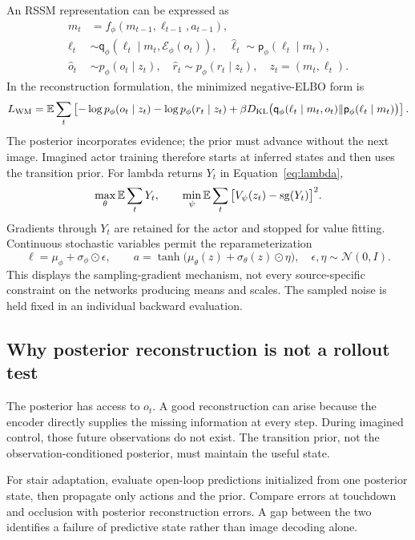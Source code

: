 An RSSM representation can be expressed as
\begin{align}
m_t&=f_\phi(m_{t-1},\ell_{t-1},a_{t-1}),\\
\ell_t&\sim\mathsf q_\phi(\ell_t\mid m_t,\mathcal E_\phi(o_t)),
\quad\hat\ell_t\sim\mathsf p_\phi(\ell_t\mid m_t),\\
\hat o_t&\sim p_\phi(o_t\mid z_t),\quad
\hat r_t\sim p_\phi(r_t\mid z_t),\quad z_t=(m_t,\ell_t).
\end{align}
In the reconstruction formulation, the minimized negative-ELBO form is
\begin{equation}
L_{\rm WM}=\mathbb E\sum_t\left[-\log p_\phi(o_t\mid z_t)-\log p_\phi(r_t\mid z_t)
+\beta D_{\mathrm{KL}}\big(\mathsf q_\phi(\ell_t\mid m_t,o_t)\|\mathsf p_\phi(\ell_t\mid m_t)\big)\right].
\end{equation}
The posterior incorporates evidence; the prior must advance without the next
image. Imagined actor training therefore starts at inferred states and then uses
the transition prior. For lambda returns $Y_t$ in Equation~\eqref{eq:lambda},
\begin{equation}
\max_\theta\mathbb E\sum_tY_t,\qquad
\min_\psi\mathbb E\sum_t\big[V_\psi(z_t)-\operatorname{sg}(Y_t)\big]^2.
\end{equation}
Gradients through $Y_t$ are retained for the actor and stopped for value fitting.
Continuous stochastic variables permit the reparameterization
\begin{equation}
\ell=\mu_\phi+\sigma_\phi\odot\epsilon,\qquad
a=\tanh\big(\mu_\theta(z)+\sigma_\theta(z)\odot\eta\big),
\quad\epsilon,\eta\sim\mathcal N(0,I).
\end{equation}
This displays the sampling-gradient mechanism, not every source-specific
constraint on the networks producing means and scales. The sampled noise is
held fixed in an individual backward evaluation.

\subsection{Why posterior reconstruction is not a rollout test}
The posterior has access to $o_t$. A good reconstruction can arise because the
encoder directly supplies the missing information at every step. During imagined
control, those future observations do not exist. The transition prior, not the
observation-conditioned posterior, must maintain the useful state.

For stair adaptation, evaluate open-loop predictions initialized from one
posterior state, then propagate only actions and the prior. Compare errors at
touchdown and occlusion with posterior reconstruction errors. A gap between the
two identifies a failure of predictive state rather than image decoding alone.

